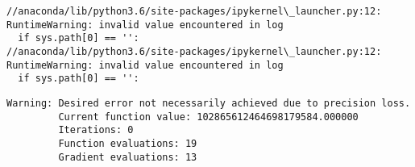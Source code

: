 \documentclass[11pt]{article}
\begin{document}
    \begin{Verbatim}[commandchars=\\\{\}]
//anaconda/lib/python3.6/site-packages/ipykernel\_launcher.py:12: RuntimeWarning: invalid value encountered in log
  if sys.path[0] == '':
//anaconda/lib/python3.6/site-packages/ipykernel\_launcher.py:12: RuntimeWarning: invalid value encountered in log
  if sys.path[0] == '':

    \end{Verbatim}

    \begin{Verbatim}[commandchars=\\\{\}]
Warning: Desired error not necessarily achieved due to precision loss.
         Current function value: 102865612464698179584.000000
         Iterations: 0
         Function evaluations: 19
         Gradient evaluations: 13

    \end{Verbatim}

    \begin{center}
    \end{center}
    { \hspace*{\fill} \\}
    

    
    
    
    
\end{document}
